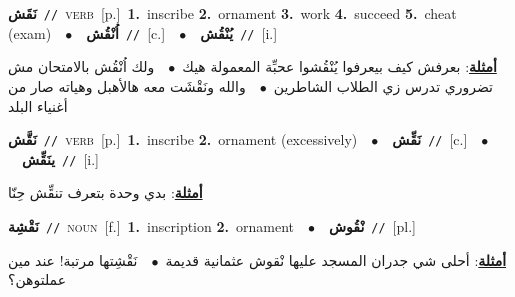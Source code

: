 \documentclass[10pt,a4paper,twoside]{article} %
\begin{document}
\begin{multicols}{2}
{\setlength\topsep{0pt}\textbf{\foreignlanguage{arabic}{نَقَش}}\ {\color{gray}\texttt{//}\color{black}}\ \textsc{verb}\ [p.]\ \textbf{1.}~inscribe  \textbf{2.}~ornament  \textbf{3.}~work  \textbf{4.}~succeed  \textbf{5.}~cheat (exam)\ \ $\bullet$\ \ \setlength\topsep{0pt}\textbf{\foreignlanguage{arabic}{اُنْقُش}}\ {\color{gray}\texttt{//}\color{black}}\ [c.]\ \ $\bullet$\ \ \setlength\topsep{0pt}\textbf{\foreignlanguage{arabic}{يُنْقُش}}\ {\color{gray}\texttt{//}\color{black}}\ [i.]\  \begin{flushright}\color{gray}\foreignlanguage{arabic}{\textbf{\underline{\foreignlanguage{arabic}{أمثلة}}}: بعرفش كيف بيعرفوا يُنْقُشوا عحبِّة المعمولة هيك\ $\bullet$\ \  ولك اُنْقُش بالامتحان مش تضروري تدرس زي الطلاب الشاطرين\ $\bullet$\ \  والله ونَقْشَت معه هالأهبل وهياته صار من أغنياء البلد}\end{flushright}\color{black}} \vspace{2mm}

{\setlength\topsep{0pt}\textbf{\foreignlanguage{arabic}{نَقَّش}}\ {\color{gray}\texttt{//}\color{black}}\ \textsc{verb}\ [p.]\ \textbf{1.}~inscribe  \textbf{2.}~ornament (excessively)\ \ $\bullet$\ \ \setlength\topsep{0pt}\textbf{\foreignlanguage{arabic}{نَقِّش}}\ {\color{gray}\texttt{//}\color{black}}\ [c.]\ \ $\bullet$\ \ \setlength\topsep{0pt}\textbf{\foreignlanguage{arabic}{ينَقِّش}}\ {\color{gray}\texttt{//}\color{black}}\ [i.]\  \begin{flushright}\color{gray}\foreignlanguage{arabic}{\textbf{\underline{\foreignlanguage{arabic}{أمثلة}}}: بدي وحدة بتعرف تنقِّش حِنّا}\end{flushright}\color{black}} \vspace{2mm}

{\setlength\topsep{0pt}\textbf{\foreignlanguage{arabic}{نَقْشِة}}\ {\color{gray}\texttt{//}\color{black}}\ \textsc{noun}\ [f.]\ \textbf{1.}~inscription  \textbf{2.}~ornament\ \ $\bullet$\ \ \setlength\topsep{0pt}\textbf{\foreignlanguage{arabic}{نْقُوش}}\ {\color{gray}\texttt{//}\color{black}}\ [pl.]\  \begin{flushright}\color{gray}\foreignlanguage{arabic}{\textbf{\underline{\foreignlanguage{arabic}{أمثلة}}}: أحلى شي جدران المسجد عليها نْقوش عثمانية قديمة\ $\bullet$\ \  نَقْشِتها مرتبة! عند مين عملتوهن؟}\end{flushright}\color{black}} \vspace{2mm}


\end{multicols}
\end{document}
